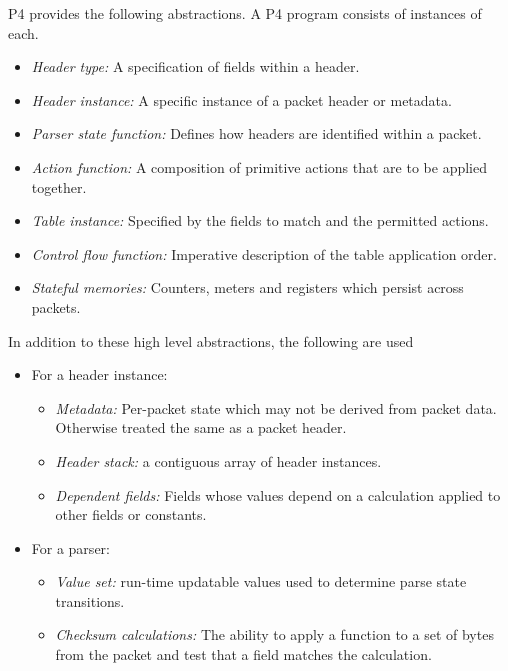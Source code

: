\documentclass[12pt]{article}
\begin{document}
P4 provides the following abstractions. A P4 program consists of instances 
of each.

\begin{itemize}
\item
\textit{Header type:} A specification of fields within a header.
\item
\textit{Header instance:} A specific instance of a packet header or metadata.
\item
\textit{Parser state function:} Defines how headers are identified
within a packet.
\item
\textit{Action function:} A composition of primitive actions that are to be applied 
together.
\item
\textit{Table instance:} Specified by the fields to match and the permitted actions.
\item
\textit{Control flow function:} Imperative description of the table application order. 
\item
\textit{Stateful memories:} Counters, meters and registers which persist across packets.
\end{itemize}


In addition to these high level abstractions, the following are used

\begin{itemize}
\item
For a header instance:
\begin{itemize}
\item
\textit{Metadata:} Per-packet state which may not be derived from
packet data. Otherwise treated the same as a packet header.
\item
\textit{Header stack:} a contiguous array of header instances.
\item
\textit{Dependent fields:} Fields whose values depend on a calculation
applied to other fields or constants.
\end{itemize}

\item
For a parser:

\begin{itemize}
\item
\textit{Value set:} run-time updatable values used to determine parse
state transitions.
\item
\textit{Checksum calculations:} The ability to apply a function to a
set of bytes from the packet and test that a field matches the
calculation.
\end{itemize}

\end{itemize}
\end{document}
